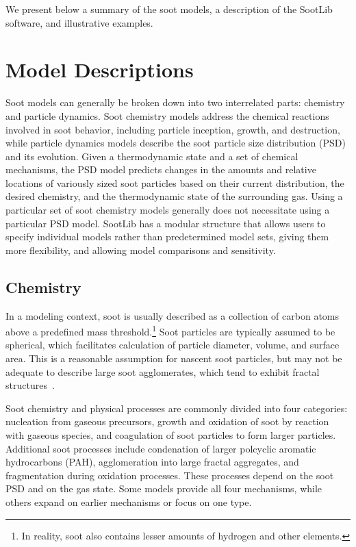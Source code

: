 \documentclass[preprint,letterpaper]{elsarticle}
\begin{document}
We present below a summary of the soot models, a description of the SootLib software, and illustrative examples.


\section{Model Descriptions}
\label{s:models}

Soot models can generally be broken down into two interrelated parts: chemistry and particle dynamics. Soot chemistry models address the chemical reactions involved in soot behavior, including particle inception, growth, and destruction, while particle dynamics models describe the soot particle size distribution (PSD) and its evolution. Given a thermodynamic state and a set of chemical mechanisms, the PSD model predicts changes in the amounts and relative locations of variously sized soot particles based on their current distribution, the desired chemistry, and the thermodynamic state of the surrounding gas. Using a particular set of soot chemistry models generally does not necessitate using a particular PSD model.
SootLib has a modular structure that allows users to specify individual models rather than predetermined model sets, giving them more flexibility, and allowing model comparisons and sensitivity.

\subsection{Chemistry}
\label{s:chemistry}

In a modeling context, soot is usually described as a collection of carbon atoms above a predefined mass threshold.\footnote{In reality, soot also contains lesser amounts of hydrogen and other elements.} Soot particles are typically assumed to be spherical, which facilitates calculation of particle diameter, volume, and surface area. This is a reasonable assumption for nascent soot particles, but may not be adequate to describe large soot agglomerates, which tend to exhibit fractal structures~\cite{Jullien_1987,Wang_2011}.

Soot chemistry and physical processes are commonly divided into four categories: nucleation from gaseous precursors, growth and oxidation of soot by reaction with gaseous species, and coagulation of soot particles to form larger particles. Additional soot processes include condenation of larger polcyclic aromatic hydrocarbons (PAH), agglomeration into large fractal aggregates, and fragmentation during oxidation processes.
These processes depend on the soot PSD and on the gas state.
Some models provide all four mechanisms, while others expand on earlier mechanisms or focus on one type.
\end{document}
